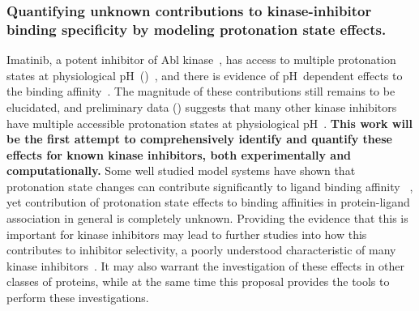 \documentclass[10pt,final]{article}
\newcommand{\pH}{p$\mathrm{H}$\ }
\begin{document}
\subsubsection*{Quantifying unknown contributions to kinase-inhibitor binding specificity by modeling protonation state effects.}
Imatinib, a potent inhibitor of Abl kinase~\autocite{Druker2001a}, has access to multiple protonation states at physiological \pH ()~\autocite{Szakacs2005a}, and there is evidence of \pH dependent effects to the binding affinity~\autocite{Seeliger2007a,Lin2013a}.
%
The magnitude of these contributions still remains to be elucidated, and preliminary data () suggests that many other kinase inhibitors have multiple accessible protonation states at physiological \pH.
%
\textbf{This work will be the first attempt to comprehensively identify and quantify these effects for known kinase inhibitors, both experimentally and computationally.}
%
Some well studied model systems have shown that protonation state changes can contribute significantly to ligand binding affinity ~\autocite{Dullweber2001a,Aleksandrov2007a,Czodrowski2007a,Steuber2007a,Czodrowski2007b}, yet contribution of protonation state effects to binding affinities in protein-ligand association in general is completely unknown. 
%
Providing the evidence that this is important for kinase inhibitors may lead to further studies into how this contributes to inhibitor selectivity, a poorly understood characteristic of many kinase inhibitors~\autocite{Knight2005a,Karaman2008a}.
%
It may also warrant the investigation of these effects in other classes of proteins, while at the same time this proposal provides the tools to perform these investigations.
\end{document}
